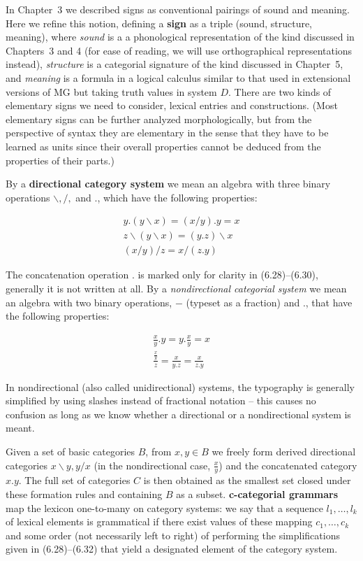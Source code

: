 In Chapter~3 we described signs as conventional pairings of sound and meaning.
Here we refine this notion, defining a {\bf sign} as a triple (sound,
structure, meaning), where {\it sound} is a a phonological
representation of the kind discussed in Chapters~3 and 4 (for ease of reading,
we will use orthographical representations instead), {\it structure} is a
categorial signature of the kind discussed in Chapter~5, and {\it meaning} is
a formula in a logical calculus similar to that used in extensional versions
of MG but taking truth values in system $D$. There are two kinds of elementary
signs we need to consider, lexical entries and constructions.  (Most
elementary signs can be further analyzed morphologically, but from the
perspective of syntax they are elementary in the sense that they have to be
learned as units since their overall properties cannot be deduced from the
properties of their parts.)

By a {\bf directional category system} we mean an algebra with three binary
operations $\backslash,/,$ and $.$, which have the following properties:

\begin{eqnarray}
y.(y\backslash x) = (x/y).y = x\\
z\backslash (y\backslash x) = (y.z)\backslash x\\
(x/y)/z=x/(z.y)
\end{eqnarray}

\smallskip\noindent The concatenation operation $.$ is marked only for clarity
in (6.28)--(6.30), generally it is not written at all. By a {\it
  nondirectional categorial system} we mean an algebra with two binary
operations, $-$ (typeset as a fraction) and $.$, that have the following
properties: 

\begin{eqnarray}
\frac{x}{y}.y= y.\frac{x}{y}=x\\
\frac{\frac{x}{y}}{z}=\frac{x}{y.z}=\frac{x}{z.y}
\end{eqnarray}

\smallskip\noindent In nondirectional (also called unidirectional) systems,
the typography is generally simplified by using slashes instead of fractional
notation -- this causes no confusion as long as we know whether a directional
or a nondirectional system is meant.

Given a set of basic categories $B$, from $x,y \in B$ we freely form derived
directional categories $x\backslash y, y/x$ (in the nondirectional case,
$\frac{x}{y}$) and the concatenated category $x.y$. The full set of categories
$C$ is then obtained as the smallest set closed under these formation rules
and containing $B$ as a subset. {\bf c-categorial grammars} map the lexicon
one-to-many on category systems: we say that a sequence $l_1, \ldots, l_k$ of
lexical elements is grammatical if there exist values of these mapping $c_1,
\ldots, c_k$ and some order (not necessarily left to right) of performing the
simplifications given in (6.28)--(6.32) that yield a designated element of the
category system.

